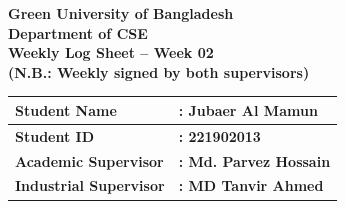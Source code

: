 \documentclass[a4paper,11pt]{article}
\begin{document}
\newpage

\begin{center}
    {\Large \textbf{Green University of Bangladesh}} \\[0.5em]
    {\large \textbf{Department of CSE}} \\[0.5em]
    {\large \textbf{Weekly Log Sheet -- Week 02}} \\[0.5em]
    {\color{red} \textbf{(N.B.: Weekly signed by both supervisors)}}
\end{center}

\vspace{1em}

\begin{tabularx}{\textwidth}{|l|X|}
\hline
\textbf{Student Name} & \textbf{: Jubaer Al Mamun} \\ \hline
\textbf{Student ID} & \textbf{: 221902013} \\ \hline
\textbf{Academic Supervisor} & \textbf{: Md. Parvez Hossain} \\ \hline
\textbf{Industrial Supervisor} & \textbf{: MD Tanvir Ahmed} \\ \hline
\end{tabularx}

\vspace{1em}
\end{document}
